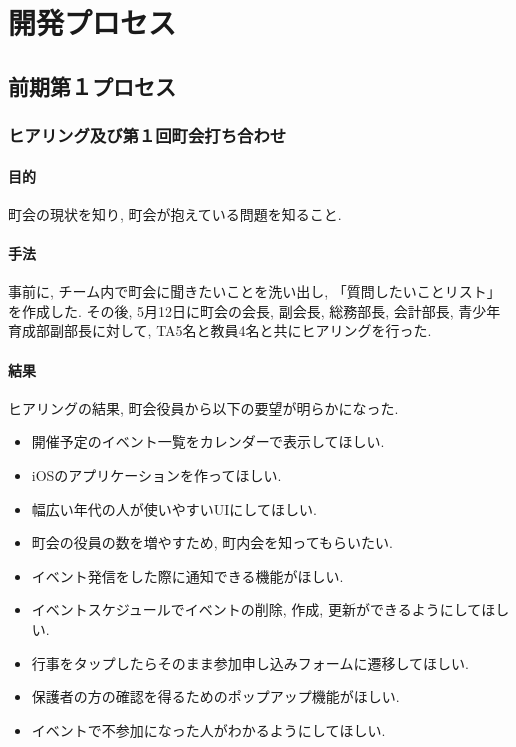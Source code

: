 \chapter{開発プロセス}

\section{前期第１プロセス}

\subsection{ヒアリング及び第１回町会打ち合わせ}
\subsubsection{目的}
町会の現状を知り, 町会が抱えている問題を知ること.
\subsubsection{手法}
事前に, チーム内で町会に聞きたいことを洗い出し, 「質問したいことリスト」を作成した.
その後, 5月12日に町会の会長, 副会長, 総務部長, 会計部長, 青少年育成部副部長に対して, TA5名と教員4名と共にヒアリングを行った.
\subsubsection{結果}
ヒアリングの結果, 町会役員から以下の要望が明らかになった.

\begin{itemize}
\item 開催予定のイベント一覧をカレンダーで表示してほしい.
\item iOSのアプリケーションを作ってほしい.
\item 幅広い年代の人が使いやすいUIにしてほしい.
\item 町会の役員の数を増やすため, 町内会を知ってもらいたい.
\item イベント発信をした際に通知できる機能がほしい.
\item イベントスケジュールでイベントの削除, 作成, 更新ができるようにしてほしい.
\item 行事をタップしたらそのまま参加申し込みフォームに遷移してほしい.
\item 保護者の方の確認を得るためのポップアップ機能がほしい.
\item イベントで不参加になった人がわかるようにしてほしい.
\end{itemize}

